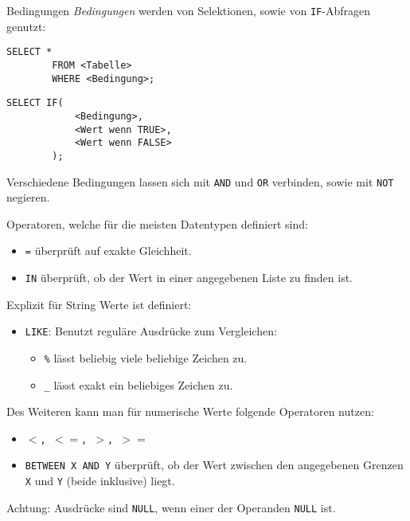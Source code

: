 \begin{sql}{Bedingungen}
    \emph{Bedingungen} werden von Selektionen, sowie von \texttt{IF}-Abfragen genutzt:

    \begin{lstlisting}[style=SqlInputStyle]
        SELECT *
        FROM <Tabelle>
        WHERE <Bedingung>;
    \end{lstlisting}

    \begin{lstlisting}[style=SqlInputStyle]
        SELECT IF(
            <Bedingung>,
            <Wert wenn TRUE>,
            <Wert wenn FALSE>
        );
    \end{lstlisting}

    Verschiedene Bedingungen lassen sich mit \texttt{AND} und \texttt{OR} verbinden, sowie mit \texttt{NOT} negieren.

    Operatoren, welche für die meisten Datentypen definiert sind:

    \begin{itemize}
        \item \texttt{=} überprüft auf exakte Gleichheit.
        \item \texttt{IN} überprüft, ob der Wert in einer angegebenen Liste zu finden ist.
    \end{itemize}

    Explizit für String Werte ist definiert:

    \begin{itemize}
        \item \texttt{LIKE}: Benutzt reguläre Ausdrücke zum Vergleichen:
            \begin{itemize}
                \item \texttt{\%} lässt beliebig viele beliebige Zeichen zu.
                \item \texttt{\_} lässt exakt ein beliebiges Zeichen zu.
            \end{itemize}
    \end{itemize}

    Des Weiteren kann man für numerische Werte folgende Operatoren nutzen:

    \begin{itemize}
        \item \texttt{$<$, $<=$, $>$, $>=$}
        \item \texttt{BETWEEN X AND Y} überprüft, ob der Wert zwischen den angegebenen Grenzen \texttt{X} und \texttt{Y} (beide inklusive) liegt.
    \end{itemize}

    Achtung: Ausdrücke sind \texttt{NULL}, wenn einer der Operanden \texttt{NULL} ist.
\end{sql}

